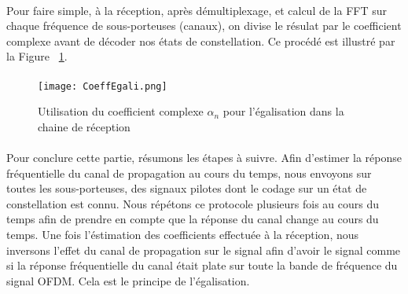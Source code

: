 \paragraph{}
Pour faire simple, à la réception, après démultiplexage, et calcul de la FFT sur chaque fréquence de sous-porteuses (canaux), on divise le résulat par le coefficient complexe avant de décoder nos états de constellation. Ce procédé est illustré par la Figure ~\ref{UtilCoeff}. 

\paragraph{}
\vspace{1\baselineskip}
\begin{figure}[!h]
  \centering
  \texttt{[image: CoeffEgali.png]}
  \caption{Utilisation du coefficient complexe $\alpha_n$ pour l'égalisation dans la chaine de réception }
	\label{UtilCoeff} 
\end{figure}
\vspace{2\baselineskip}

\paragraph{}
Pour conclure cette partie, résumons les étapes à suivre. Afin d'estimer la réponse fréquentielle du canal de propagation au cours du temps, nous envoyons sur toutes les sous-porteuses, des signaux pilotes dont le codage sur un état de constellation est connu. Nous répétons ce protocole plusieurs fois au cours du temps afin de prendre en compte que la réponse du canal change au cours du temps. Une fois l'éstimation des coefficients effectuée à la réception, nous inversons l'effet du canal de propagation sur le signal afin d'avoir le signal comme si la réponse fréquentielle du canal était plate sur toute la bande de fréquence du signal OFDM. Cela est le principe de l'égalisation.

